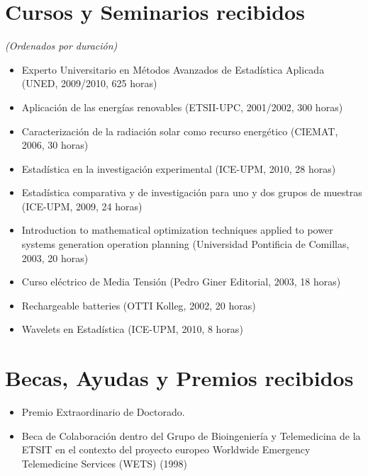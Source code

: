 \documentclass[article, a4paper]{memoir}
\begin{document}
\section{Cursos y Seminarios recibidos}
\label{sec:org7f4d243}

\emph{(Ordenados por duración)}

\begin{itemize}
\item Experto Universitario en Métodos Avanzados de Estadística Aplicada (UNED, 2009/2010, 625 horas)

\item Aplicación de las energías renovables (ETSII-UPC, 2001/2002, 300 horas)

\item Caracterización de la radiación solar como recurso energético (CIEMAT, 2006, 30 horas)

\item Estadística en la investigación experimental (ICE-UPM, 2010, 28 horas)

\item Estadística comparativa y de investigación para uno y dos grupos de muestras (ICE-UPM, 2009, 24 horas)

\item Introduction to mathematical optimization techniques applied to power systems generation operation planning (Universidad Pontificia de Comillas, 2003, 20 horas)

\item Curso eléctrico de Media Tensión (Pedro Giner Editorial, 2003, 18 horas)

\item Rechargeable batteries (OTTI Kolleg, 2002, 20 horas)

\item Wavelets en Estadística (ICE-UPM, 2010, 8 horas)
\end{itemize}


\section{Becas, Ayudas y Premios recibidos}
\label{sec:org9735d5e}

\begin{itemize}
\item Premio Extraordinario de Doctorado.
\item Beca de Colaboración dentro del Grupo de Bioingeniería y Telemedicina de la ETSIT en el contexto del proyecto europeo \guillemotleft{}Worldwide Emergency Telemedicine Services\guillemotright{} (WETS) (1998)
\end{itemize}
\end{document}
